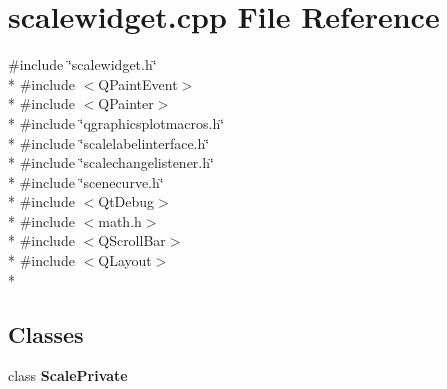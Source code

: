 \section{scalewidget.\+cpp File Reference}
\label{scalewidget_8cpp}
{\ttfamily \#include \char`\"{}scalewidget.\+h\char`\"{}}\\*
{\ttfamily \#include $<$Q\+Paint\+Event$>$}\\*
{\ttfamily \#include $<$Q\+Painter$>$}\\*
{\ttfamily \#include \char`\"{}qgraphicsplotmacros.\+h\char`\"{}}\\*
{\ttfamily \#include \char`\"{}scalelabelinterface.\+h\char`\"{}}\\*
{\ttfamily \#include \char`\"{}scalechangelistener.\+h\char`\"{}}\\*
{\ttfamily \#include \char`\"{}scenecurve.\+h\char`\"{}}\\*
{\ttfamily \#include $<$Qt\+Debug$>$}\\*
{\ttfamily \#include $<$math.\+h$>$}\\*
{\ttfamily \#include $<$Q\+Scroll\+Bar$>$}\\*
{\ttfamily \#include $<$Q\+Layout$>$}\\*
\subsection*{Classes}
\begin{DoxyCompactItemize}
\item 
class {\bf Scale\+Private}
\end{DoxyCompactItemize}
